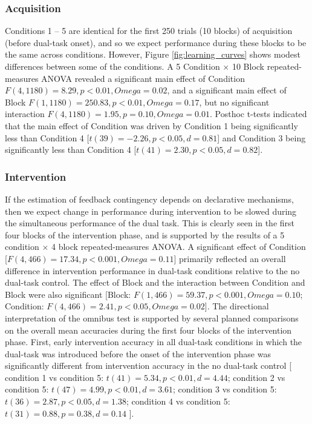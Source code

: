 \documentclass[man,apacite,draftfirst]{apa6}
\begin{document}
\subsubsection*{Acquisition}
Conditions 1 -- 5 are identical for the first 250 trials (10 blocks) of
acquisition (before dual-task onset), and so we expect performance during these
blocks to be the same across conditions. However, Figure
\ref{fig:learning_curves} shows modest differences between some of the
conditions. A 5 Condition $\times$ 10 Block repeated-measures ANOVA revealed a
significant main effect of Condition $F(4,1180) = 8.29, p < 0.01, Omega = 0.02$,
and a significant main effect of Block $F(1,1180) = 250.83, p < 0.01, Omega =
0.17$, but no significant interaction $F(4,1180) = 1.95, p = 0.10, Omega =
0.01$. Posthoc t-tests indicated that the main effect of Condition was driven by
Condition 1 being significantly less than Condition 4 [$t(39) = -2.26, p < 0.05,
d = 0.81$] and Condition 3 being significantly less than Condition 4 [$t(41) =
2.30, p < 0.05, d = 0.82$].


\subsubsection*{Intervention}
If the estimation of feedback contingency depends on declarative mechanisms,
then we expect change in performance during intervention to be slowed during the
simultaneous performance of the dual task. This is clearly seen in the first
four blocks of the intervention phase, and is supported by the results of a 5
condition $\times$ 4 block repeated-measures ANOVA. A significant effect of
Condition [$F(4,466) = 17.34, p < 0.001, Omega = 0.11$] primarily reflected an
overall difference in intervention performance in dual-task conditions relative
to the no dual-task control. The effect of Block and the interaction between
Condition and Block were also significant [Block: $F(1,466) = 59.37, p < 0.001,
Omega = 0.10$; Condition: $F(4,466) = 2.41, p < 0.05, Omega = 0.02$].
The directional interpretation of the omnibus test is supported by several
planned comparisons on the overall mean accuracies during the first four blocks
of the intervention phase. First, early intervention accuracy in all dual-task
conditions in which the dual-task was introduced before the onset of the
intervention phase was significantly different from intervention accuracy in the no
dual-task control
[
condition 1 vs condition 5: $t(41) = 5.34, p < 0.01, d = 4.44$;
condition 2 vs condition 5: $t(47) = 4.99, p < 0.01, d = 3.61$;
condition 3 vs condition 5: $t(36) = 2.87, p < 0.05, d = 1.38$;
condition 4 vs condition 5: $t(31) = 0.88, p = 0.38, d = 0.14$ 
].
\end{document}
